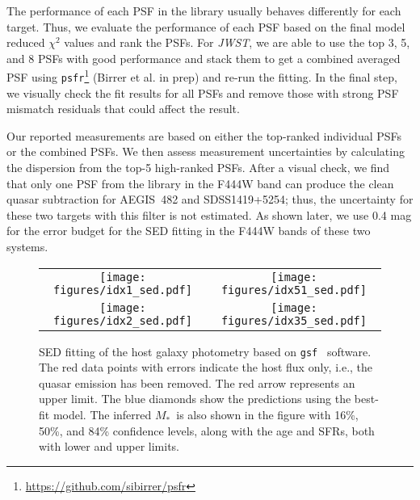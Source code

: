 \documentclass[twocolumn,]{aastex631}
\newcommand{\smass}{{$M_*$}}
\newcommand{\jwst}{{\it JWST}}
\begin{document}
The performance of each PSF in the library usually behaves differently for each target. Thus, we evaluate the performance of each PSF based on the final model reduced $\chi^2$ values and rank the PSFs. For \jwst, we are able to use the top 3, 5, and 8 PSFs with good performance and stack them to get a combined averaged PSF using \texttt{psfr}\footnote{\url{https://github.com/sibirrer/psfr}\label{note1}} (Birrer et al. in prep) and re-run the fitting. In the final step, we visually check the fit results for all PSFs and remove those with strong PSF mismatch residuals that could affect the result. 

Our reported measurements are based on either the top-ranked individual PSFs or the combined PSFs. We then assess measurement uncertainties by calculating the dispersion from the top-5 high-ranked PSFs. After a visual check, we find that only one PSF from the library in the F444W band can produce the clean quasar subtraction for AEGIS~482 and SDSS1419+5254; thus, the uncertainty for these two targets with this filter is not estimated. As shown later, we use 0.4 mag for the error budget for the SED fitting in the F444W bands of these two systems.


\begin{figure*}
\centering
\begin{tabular}{c c}
\hspace*{-1cm}  
{\texttt{[image: figures/idx1\_sed.pdf]}}&
{\texttt{[image: figures/idx51\_sed.pdf]}}\\
\hspace*{-1cm}  
{\texttt{[image: figures/idx2\_sed.pdf]}}&
{\texttt{[image: figures/idx35\_sed.pdf]}}\\
\end{tabular}
\caption{SED fitting of the host galaxy photometry based on \texttt{gsf}~\citep{Morishita2019} software. The red data points with errors indicate the host flux only, i.e., the quasar emission has been removed. The red arrow represents an upper limit. The blue diamonds show the predictions using the best-fit model. The inferred \smass\ is also shown in the figure with 16\%, 50\%, and 84\% confidence levels, along with the age and SFRs, both with lower and upper limits.
\label{fig:sed_spec}}
\end{figure*}
\end{document}
